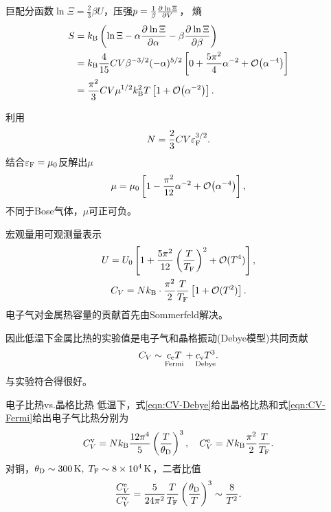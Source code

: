 巨配分函数$\ln\Xi=\frac23\beta U$，压强$p=\frac1\beta\frac{\partial^{{}}\ln\Xi}{\partial{V}^{{}}}$，
熵
\begin{align}\notag
	S&=k_{\mathrm B}\left(\ln\Xi-\alpha\frac{\partial^{{}}\ln\Xi}{\partial{\alpha}^{{}}}-\beta\frac{\partial^{{}}\ln\Xi}{\partial{\beta}^{{}}}\right)\\\notag
	&=k_{\mathrm B}\frac4{15}CV\beta^{-3/2}(-\alpha)^{5/2}\left[0+\frac{5\pi^2}4\alpha^{-2}+\mathcal O\!\left(\alpha^{-4}\right)\right]\\
	&=\frac{\pi^2}3CV\mu^{1/2}k_{\mathrm B}^2T\left[1+\mathcal O\!\left(\alpha^{-2}\right)\right].
\end{align}

利用
\[
	N=\frac23CV\varepsilon_\mathrm F^{3/2}.
\]
结合$\varepsilon_\mathrm F=\mu_0$反解出$\mu$
\[
	\mu=\mu_0\left[1-\frac{\pi^2}{12}\alpha^{-2}+\mathcal O\!\left(\alpha^{-4}\right)\right],
\]
不同于Bose气体，$\mu$可正可负。

宏观量用可观测量表示
\begin{gather}
	U=U_0\left[1+\frac{5\pi^2}{12}\left(\frac T{T_\mathrm F}\right)^2+\mathcal O(T^4)\right],\\
	\label{eqn:CV-Fermi}
	C_V=Nk_{\mathrm B}\cdot\frac{\pi^2}{2}\frac T{T_\mathrm F}\left[1+\mathcal O(T^2)\right].
\end{gather}
电子气对金属热容量的贡献首先由Sommerfeld解决。

因此低温下金属比热的实验值是电子气和晶格振动(Debye模型)共同贡献
\[
	C_V\sim \underset{\text{Fermi}}{c_\mathrm e T}+\underset{\text{Debye}}{c_\mathrm v T^3}.
\]
与实验符合得很好。
\begin{example}{电子比热vs.晶格比热}{}
	低温下，式\eqref{eqn:CV-Debye}给出晶格比热和式\eqref{eqn:CV-Fermi}给出电子气比热分别为
	\[
	C_V^\mathrm v=Nk_{\mathrm B}\frac{12\pi^4}5\left(\frac T{\theta_\mathrm D}\right)^3,\quad C_V^\mathrm e=Nk_{\mathrm B}\frac{\pi^2}2\frac T{T_\mathrm F}.
	\]
	对铜，$\theta_\Db\sim\SI{300}\K,\;T_\Fm\sim\SI{8e4}\K$，二者比值
	\[
	\frac{C_V^\mathrm e}{C_V^\mathrm v}=\frac5{24\pi^2}\frac T{T_\mathrm F}\left(\frac{\theta_\mathrm D}T\right)^3\sim\frac8{T^2}.
	\]
\end{example}